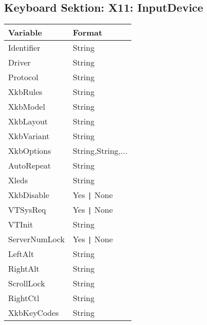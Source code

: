 \subsection{Keyboard Sektion: X11: InputDevice}
\begin{tabular}[h]{|p{6cm}|p{7cm}|}
 \hline
 \textbf{Variable}     & \textbf{Format}        \\
 \hline
 Identifier       & String                             \\
 Driver           & String                             \\
 Protocol         & String                             \\
 XkbRules         & String                             \\
 XkbModel         & String                             \\
 XkbLayout        & String                             \\
 XkbVariant       & String                             \\
 XkbOptions       & String,String,...                  \\
 AutoRepeat       & String                             \\
 Xleds            & String                             \\
 XkbDisable       & Yes \verb+|+ None                  \\
 VTSysReq         & Yes \verb+|+ None                  \\
 VTInit           & String                             \\
 ServerNumLock    & Yes \verb+|+ None                  \\
 LeftAlt          & String                             \\
 RightAlt         & String                             \\
 ScrollLock       & String                             \\
 RightCtl         & String                             \\
 XkbKeyCodes      & String                             \\
 \hline
\end{tabular}

\newpage
{}
